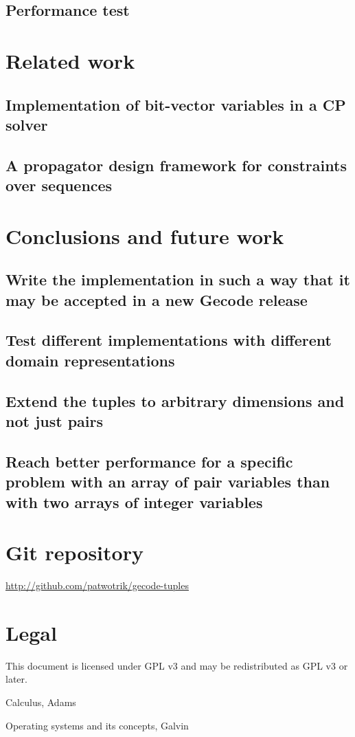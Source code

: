\documentclass[a4paper,11pt]{article}
\begin{document}
\subsection{Performance test}

\section{Related work}
\subsection{Implementation of bit-vector variables in a CP solver}
\subsection{A propagator design framework for constraints over sequences}

\section{Conclusions and future work}

\subsection{Write the implementation in such a way that it may be accepted in a new Gecode release}
\subsection{Test different implementations with different domain representations}
\subsection{Extend the tuples to arbitrary dimensions and not just pairs}
\subsection{Reach better performance for a specific problem with an array of pair variables than with two arrays of integer variables}

\section{Git repository}
\url{http://github.com/patwotrik/gecode-tuples}

\section{Legal}
This document is licensed under GPL v3 and may be redistributed as GPL v3 or later. 

\begin{thebibliography}{99}
	Calculus, 
	Adams
	
	Operating systems and its concepts,
	Galvin
	
\end{thebibliography}
\end{document}
